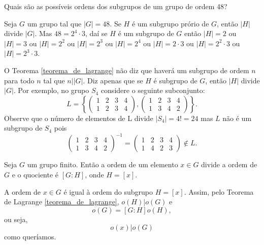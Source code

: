 \begin{exemplo}
    Quais são as possíveis ordens dos subgrupos de um grupo de ordem 48?
    \begin{solucao}
        Seja $G$ um grupo tal que $|G|=48$. Se $H$ é um subgrupo prório de $G$, então $|H|$ divide $|G|$. Mas $48=2^{4}\cdot 3$, daí se $H$ é um subgrupo de $G$ então $|H|=2$ ou $|H|=3$ ou $|H|= 2^{2}$ ou $|H|=2^{3}$ ou $|H|=2^{4}$ ou $|H|=2\cdot3$ ou $|H|=2^2\cdot 3$ ou $|H|=2^3\cdot 3$.
    \end{solucao}
\end{exemplo}

\begin{observacao}
    O Teorema \ref{teorema_de_lagrange} não diz que haverá um subgrupo de ordem $n$ para todo $n$ tal que $n||G|$. Diz apenas que se $H$ é subgrupo de $G$, então $|H|$ divide $|G|$. Por exemplo, no grupo $S_4$ considere o seguinte subconjunto:
            \[
                L = \left\{\begin{pmatrix}
                    1 & 2 & 3 & 4\\
                    1 & 2 & 3 & 4
                \end{pmatrix}, \begin{pmatrix}
                    1 & 2 & 3 & 4\\
                    1 & 3 & 4 & 2
                \end{pmatrix}\right\}.
            \]
            Observe que o número de elementos de L divide $|S_4| = 4! = 24$ mas $L$ não é um subgrupo de $S_4$ pois
            \[
                \begin{pmatrix}
                    1 & 2 & 3 & 4\\
                    1 & 3 & 4 & 2
                \end{pmatrix}^{-1} = \begin{pmatrix}
                    1 & 2 & 3 & 4\\
                    1 & 4 & 2 & 3
                \end{pmatrix} \notin L.
            \]
\end{observacao}

\begin{corolario}\label{primeiro_coralario_Lagrange}
    Seja $G$ um grupo finito. Então a ordem de um elemento $x \in G$ divide a ordem de $G$ e o quociente é $[G : H]$, onde $H = [x]$.
\end{corolario}
\begin{prova}
    A ordem de $x \in G$ é igual à ordem do subgrupo $H = [x]$. Assim, pelo Teorema de Lagrange \eqref{teorema_de_lagrange}, $o(H) | o(G)$ e
    \[
        o(G) = [G : H]o(H),
    \]
    ou seja,
    \[
        o(x) | o(G)
    \]
    como queríamos.
\end{prova}

